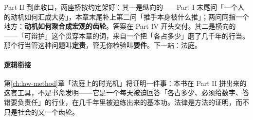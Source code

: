 \documentclass[../../main2.tex]{subfiles}
\begin{document}
	Part II 到此收口，两座桥按约定架好：其一是纵向的——Part I 末尾问「一个人的动机如何汇成大势」，本章末尾补上第二问「推手本身被什么推」；两问同指一个地方：\textbf{动机如何聚合成宏观的齿轮}。答案在 Part IV 开头交付。其二是横向的——「可辩护」这个贯穿本章的词，来自一个把「各占多少」磨了几千年的行当。那个行当管这种问题叫\textbf{定责}，管无你检验叫\textbf{要件}。下一站：法庭。

	\paragraph*{逻辑衔接}
	第\ref{ch:law-method}章「法庭上的时光机」将证明一件事：本书在 Part II 拼出来的这套工具，不是书斋发明——它是一个每天被迫回答「各占多少、必须给数字、答错要负责任」的行业，在几千年里被迫练出来的基本功。法律是方法的证明，而不只是社会的又一个齿轮。
\end{document}
